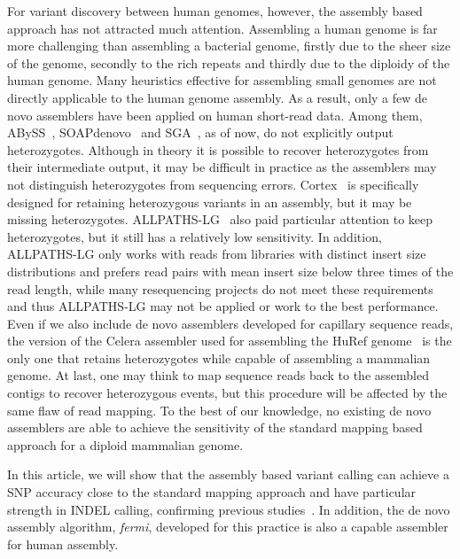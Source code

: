 \documentclass{bioinfo}
\begin{document}
For variant discovery between human genomes, however, the assembly based
approach has not attracted much attention. Assembling a human genome is far
more challenging than assembling a bacterial genome, firstly due to the sheer
size of the genome, secondly to the rich repeats and thirdly due to the
diploidy of the human genome. Many heuristics effective for assembling small
genomes are not directly applicable to the human genome assembly. As a result,
only a few de novo assemblers have been applied on human short-read data. Among
them, ABySS~\citep{Simpson:2009ys}, SOAPdenovo~\citep{Li:2010vn} and
SGA~\citep{Simpson:2011ly}, as of now, do not explicitly output heterozygotes.
Although in theory it is possible to recover heterozygotes from their
intermediate output, it may be difficult in practice as the assemblers may not
distinguish heterozygotes from sequencing errors. Cortex~\citep{Iqbal:2012ys}
is specifically designed for retaining heterozygous variants in an assembly,
but it may be missing heterozygotes. ALLPATHS-LG~\citep{Gnerre:2011ys}
also paid particular attention to keep heterozygotes, but it still has
a relatively low sensitivity. In addition, ALLPATHS-LG only works with
reads from libraries with distinct insert size distributions and prefers read
pairs with mean insert size below three times of the read length, while many
resequencing projects do not meet these requirements and thus ALLPATHS-LG may
not be applied or work to the best performance. Even if we also include de novo
assemblers developed for capillary sequence reads, the version of the Celera
assembler used for assembling the HuRef genome~\citep{Levy:2007uq} is the only
one that retains heterozygotes while capable of assembling a mammalian genome.
At last, one may think to map sequence reads back to the assembled contigs to
recover heterozygous events, but this
procedure will be affected by the same flaw of read mapping. To the best of our
knowledge, no existing de novo assemblers are able to achieve the sensitivity
of the standard mapping based approach for a diploid mammalian genome.

In this article, we will show that the assembly based variant
calling can achieve a SNP accuracy close to the standard mapping approach
and have particular strength in INDEL calling, confirming previous
studies~\citep{Iqbal:2012ys}. In addition, the de novo assembly
algorithm, \emph{fermi}, developed for this practice is also a capable
assembler for human assembly.

\vspace*{-1em}
\end{document}
